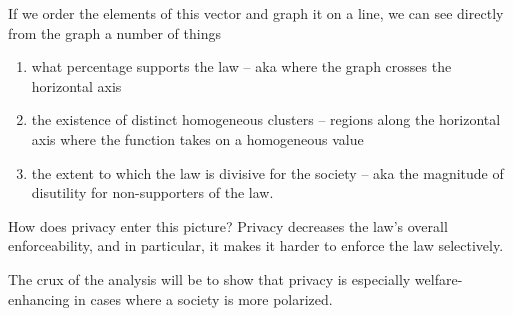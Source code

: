 %
%
%
%
%
%
%

If we order the elements of this vector and graph it on a line, we can see directly from the graph a number of things
\begin{enumerate}
\item what percentage supports the law -- aka where the graph crosses the horizontal axis
\item the existence of distinct homogeneous clusters -- regions along the horizontal axis where the function takes on a homogeneous value
\item the extent to which the law is divisive for the society -- aka the magnitude of disutility for non-supporters of the law.
\end{enumerate}

How does privacy enter this picture?
Privacy decreases the law's overall enforceability, and in particular, it makes it harder to enforce the law selectively.

The crux of the analysis will be to show that privacy is especially welfare-enhancing in cases where a society is more polarized.